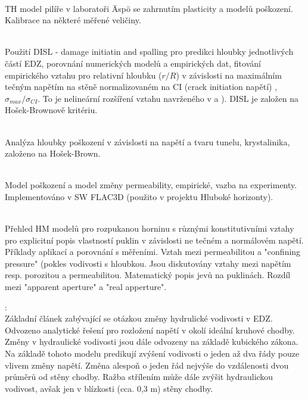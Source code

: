 \documentclass{article}
\begin{document}
\\
TH model pilíře v laboratoři \"Asp\"o se zahrnutím plasticity a modelů poškození. 
Kalibrace na některé měřené veličiny.



\\
Použití DISL - damage initiatin and spalling pro predikci hloubky jednotlivých částí EDZ,
porovnání numerických modelů a empirických dat, fitování empirického vztahu pro relativní hloubku 
($r/R$) v závislosti na maximálním tečným napětím na stěně normalizovaném na CI (crack initiation napětí)
,$\sigma_{max} / \sigma_{CI}$. To je nelineární rozšíření vztahu navrženého v
\cite{Martin1999} a \cite{Diederichs2007}). 
DISL je založen na Hošek-Brownově kritériu.

\\
Analýza hloubky poškození v závislosti na napětí a tvaru tunelu, krystalinika, založeno na Hošek-Brown.





\\
Model poškození a model změny permeability, 
empirické, vazba na experimenty. Implementováno v SW FLAC3D (použito v projektu Hluboké horizonty).

\\
Přehled HM modelů pro rozpukanou horninu s různými konstitutivními 
vztahy pro explicitní popis vlastností puklin v závislosti ne tečném a normálovém napětí. 
Příklady aplikací a porovnání s měřeními.
Vztah mezi permeabilitou a "confining pressure" 
(pokles vodivosti s hloubkou. Jsou diskutovány vztahy mezi napětím resp. 
porozitou a permeabilitou. Matematický popis jevů na puklinách. Rozdíl mezi "apparent aperture" 
a "real apperture". 



{\bf \cite{Kelsall1984}}:\\
Základní článek zabývající se otázkou změny hydrulické vodivosti v EDZ. 
Odvozeno analytické řešení pro rozložení napětí v okolí ideální kruhové chodby. 
Změny v hydraulické vodivosti jsou dále odvozeny na základě kubického zákona. 
Na základě tohoto modelu predikují zvýšení vodivosti o jeden až dva řády pouze vlivem změny napětí. Změna alespoň o jeden řád nejvýše do vzdálenosti dvou průměrů od stěny chodby. Ražba střílením může dále zvýšit hydraulickou vodivost, avšak jen v blízkosti (cca. 0,3 m) stěny chodby.
\end{document}
